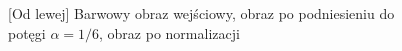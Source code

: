 \documentclass[a4paper,12pt, titlepage]{report}
\begin{document}
\begin{figure}[h]
    \centering
    \caption{[Od lewej] Barwowy obraz wejściowy, obraz po podniesieniu do potęgi \(\alpha=1/6\), obraz po normalizacji}%
    \label{fig:geo_after_grey1}%
\end{figure}
\FloatBarrier
\end{document}
